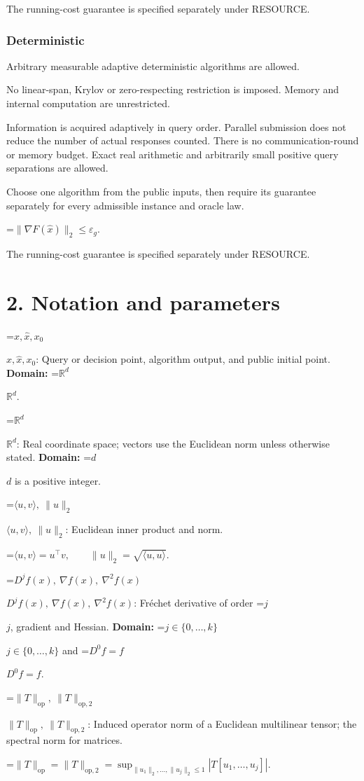 \documentclass[10pt,a4paper]{article}
\newcommand{\AtlasMath}[1]{\par\begingroup\centering\setbox0=\hbox{$\displaystyle #1$}\ifdim\wd0>1.4\linewidth\typeout{ATLAS WIDE FORMULA: \the\wd0}\fi\ifdim\wd0>\linewidth\resizebox{\linewidth}{!}{\box0}\else\box0\fi\par\endgroup}
\newcommand{\AtlasInlineMath}[1]{\begingroup\setbox0=\hbox{$#1$}\ifdim\wd0>.4\linewidth\endgroup\AtlasMath{#1}\else\endgroup$#1$\fi}
\begin{document}
The running-cost guarantee is specified separately under RESOURCE.

\subsubsection{Deterministic}
Arbitrary measurable adaptive deterministic algorithms are allowed.

No linear-span, Krylov or zero-respecting restriction is imposed. Memory and internal computation are unrestricted.

Information is acquired adaptively in query order. Parallel submission does not reduce the number of actual responses counted. There is no communication-round or memory budget. Exact real arithmetic and arbitrarily small positive query separations are allowed.

Choose one algorithm from the public inputs, then require its guarantee separately for every admissible instance and oracle law.


\AtlasMath{\|\nabla F(\widehat{x})\|_2\le \varepsilon_g.}


The running-cost guarantee is specified separately under RESOURCE.

\section{2. Notation and parameters}
\AtlasInlineMath{x,\widehat{x},x_0}: Query or decision point, algorithm output, and public initial point. \textbf{Domain:} \AtlasInlineMath{\mathbb{R}^d}.

\AtlasInlineMath{\mathbb{R}^d}: Real coordinate space; vectors use the Euclidean norm unless otherwise stated. \textbf{Domain:} \AtlasInlineMath{d} is a positive integer.

\AtlasInlineMath{\langle u,v\rangle,\ \|u\|_2}: Euclidean inner product and norm.


\AtlasMath{\langle u,v\rangle=u^\top v,\qquad\|u\|_2=\sqrt{\langle u,u\rangle}.}


\AtlasInlineMath{D^jf(x),\ \nabla f(x),\ \nabla^2f(x)}: Fréchet derivative of order \AtlasInlineMath{j}, gradient and Hessian. \textbf{Domain:} \AtlasInlineMath{j\in\{0,\ldots,k\}} and \AtlasInlineMath{D^0f=f}.

\AtlasInlineMath{\|T\|_{\mathrm{op}},\ \|T\|_{\mathrm{op},2}}: Induced operator norm of a Euclidean multilinear tensor; the spectral norm for matrices.


\AtlasMath{\|T\|_{\mathrm{op}}=\|T\|_{\mathrm{op},2}=\sup_{\|u_1\|_2,\ldots,\|u_j\|_2\le1}|T[u_1,\ldots,u_j]|.}
\end{document}
